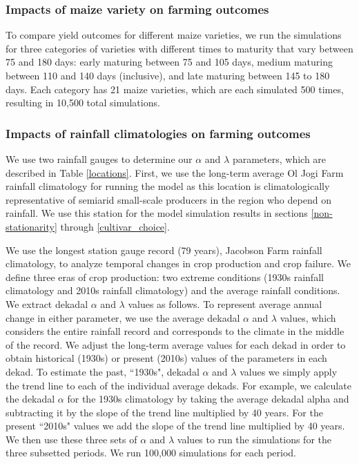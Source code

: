 \subsubsection{Impacts of maize variety on farming outcomes}

To compare yield outcomes for different maize varieties, we run the simulations for three categories of varieties with different times to maturity that vary between 75 and 180 days: early maturing between 75 and 105 days, medium maturing between 110 and 140 days (inclusive), and late maturing between 145 to 180 days. Each category has 21 maize varieties, which are each simulated 500 times, resulting in 10,500 total simulations.

\subsubsection{Impacts of rainfall climatologies on farming outcomes}

We use two rainfall gauges to determine our $\alpha$ and $\lambda$ parameters, which are described in Table \ref{locations}. First, we use the long-term average Ol Jogi Farm rainfall climatology for running the model as this location is climatologically representative of semiarid small-scale producers in the region who depend on rainfall. We use this station for the model simulation results in sections \ref{non-stationarity} through \ref{cultivar_choice}.

We use the longest station gauge record (79 years), Jacobson Farm rainfall climatology, to analyze temporal changes in crop production and crop failure. We define three eras of crop production: two extreme conditions (1930s rainfall climatology and 2010s rainfall climatology) and the average rainfall conditions. We extract dekadal $\alpha$ and $\lambda$ values as follows. To represent average annual change in either parameter, we use the average dekadal $\alpha$ and $\lambda$ values, which considers the entire rainfall record and corresponds to the climate in the middle of the record. We adjust the long-term average values for each dekad in order to obtain historical (1930s) or present (2010s) values of the parameters in each dekad. To estimate the past, ``1930s", dekadal $\alpha$ and $\lambda$ values we simply apply the trend line to each of the individual average dekads. For example, we calculate the dekadal $\alpha$ for the 1930s climatology by taking the average dekadal alpha and subtracting it by the slope of the trend line multiplied by 40 years. For the present ``2010s" values we add the slope of the trend line multiplied by 40 years.  We then use these three sets of $\alpha$ and $\lambda$ values to run the simulations for the three subsetted periods. We run 100,000 simulations for each period. 

